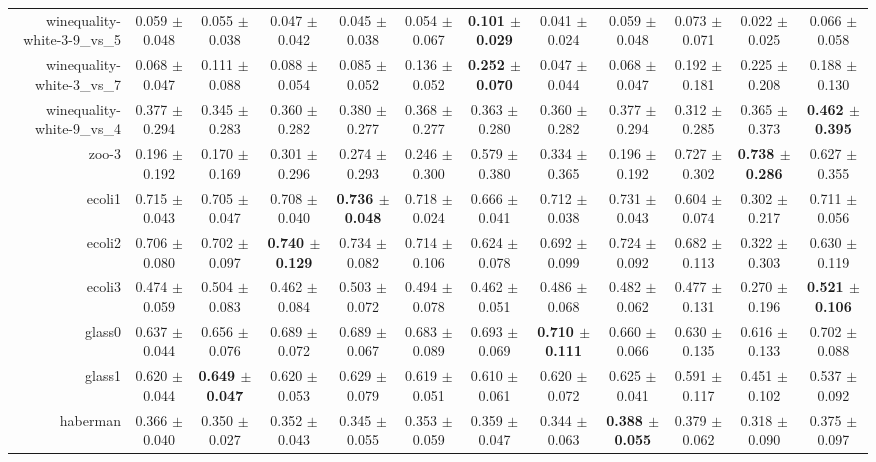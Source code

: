 \begin{table}[!ht]
{\begin{tabular}{r c c c c c c c c c c c}
winequality-white-3-9\_vs\_5 & 0.059 $\pm$ 0.048 & 0.055 $\pm$ 0.038 & 0.047 $\pm$ 0.042 & 0.045 $\pm$ 0.038 & 0.054 $\pm$ 0.067 & \textbf{0.101 $\pm$ 0.029} & 0.041 $\pm$ 0.024 & 0.059 $\pm$ 0.048 & 0.073 $\pm$ 0.071 & 0.022 $\pm$ 0.025 & 0.066 $\pm$ 0.058 \\
winequality-white-3\_vs\_7 & 0.068 $\pm$ 0.047 & 0.111 $\pm$ 0.088 & 0.088 $\pm$ 0.054 & 0.085 $\pm$ 0.052 & 0.136 $\pm$ 0.052 & \textbf{0.252 $\pm$ 0.070} & 0.047 $\pm$ 0.044 & 0.068 $\pm$ 0.047 & 0.192 $\pm$ 0.181 & 0.225 $\pm$ 0.208 & 0.188 $\pm$ 0.130 \\
winequality-white-9\_vs\_4 & 0.377 $\pm$ 0.294 & 0.345 $\pm$ 0.283 & 0.360 $\pm$ 0.282 & 0.380 $\pm$ 0.277 & 0.368 $\pm$ 0.277 & 0.363 $\pm$ 0.280 & 0.360 $\pm$ 0.282 & 0.377 $\pm$ 0.294 & 0.312 $\pm$ 0.285 & 0.365 $\pm$ 0.373 & \textbf{0.462 $\pm$ 0.395} \\
zoo-3 & 0.196 $\pm$ 0.192 & 0.170 $\pm$ 0.169 & 0.301 $\pm$ 0.296 & 0.274 $\pm$ 0.293 & 0.246 $\pm$ 0.300 & 0.579 $\pm$ 0.380 & 0.334 $\pm$ 0.365 & 0.196 $\pm$ 0.192 & 0.727 $\pm$ 0.302 & \textbf{0.738 $\pm$ 0.286} & 0.627 $\pm$ 0.355 \\
ecoli1 & 0.715 $\pm$ 0.043 & 0.705 $\pm$ 0.047 & 0.708 $\pm$ 0.040 & \textbf{0.736 $\pm$ 0.048} & 0.718 $\pm$ 0.024 & 0.666 $\pm$ 0.041 & 0.712 $\pm$ 0.038 & 0.731 $\pm$ 0.043 & 0.604 $\pm$ 0.074 & 0.302 $\pm$ 0.217 & 0.711 $\pm$ 0.056 \\
ecoli2 & 0.706 $\pm$ 0.080 & 0.702 $\pm$ 0.097 & \textbf{0.740 $\pm$ 0.129} & 0.734 $\pm$ 0.082 & 0.714 $\pm$ 0.106 & 0.624 $\pm$ 0.078 & 0.692 $\pm$ 0.099 & 0.724 $\pm$ 0.092 & 0.682 $\pm$ 0.113 & 0.322 $\pm$ 0.303 & 0.630 $\pm$ 0.119 \\
ecoli3 & 0.474 $\pm$ 0.059 & 0.504 $\pm$ 0.083 & 0.462 $\pm$ 0.084 & 0.503 $\pm$ 0.072 & 0.494 $\pm$ 0.078 & 0.462 $\pm$ 0.051 & 0.486 $\pm$ 0.068 & 0.482 $\pm$ 0.062 & 0.477 $\pm$ 0.131 & 0.270 $\pm$ 0.196 & \textbf{0.521 $\pm$ 0.106} \\
glass0 & 0.637 $\pm$ 0.044 & 0.656 $\pm$ 0.076 & 0.689 $\pm$ 0.072 & 0.689 $\pm$ 0.067 & 0.683 $\pm$ 0.089 & 0.693 $\pm$ 0.069 & \textbf{0.710 $\pm$ 0.111} & 0.660 $\pm$ 0.066 & 0.630 $\pm$ 0.135 & 0.616 $\pm$ 0.133 & 0.702 $\pm$ 0.088 \\
glass1 & 0.620 $\pm$ 0.044 & \textbf{0.649 $\pm$ 0.047} & 0.620 $\pm$ 0.053 & 0.629 $\pm$ 0.079 & 0.619 $\pm$ 0.051 & 0.610 $\pm$ 0.061 & 0.620 $\pm$ 0.072 & 0.625 $\pm$ 0.041 & 0.591 $\pm$ 0.117 & 0.451 $\pm$ 0.102 & 0.537 $\pm$ 0.092 \\
haberman & 0.366 $\pm$ 0.040 & 0.350 $\pm$ 0.027 & 0.352 $\pm$ 0.043 & 0.345 $\pm$ 0.055 & 0.353 $\pm$ 0.059 & 0.359 $\pm$ 0.047 & 0.344 $\pm$ 0.063 & \textbf{0.388 $\pm$ 0.055} & 0.379 $\pm$ 0.062 & 0.318 $\pm$ 0.090 & 0.375 $\pm$ 0.097 \\

\end{tabular}}
\end{table}
